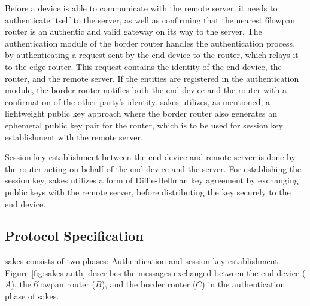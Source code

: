 Before a device is able to communicate with the remote server, it needs to authenticate itself to the server, as well as confirming that the nearest \gls{6lowpan} router is an authentic and valid gateway on its way to the server. The authentication module of the border router handles the authentication process, by authenticating a request sent by the end device to the router, which relays it to the edge router. This request contains the identity of the end device, the router, and the remote server. If the entities are registered in the authentication module, the border router notifies both the end device and the router with a confirmation of the other party's identity. \gls{sakes} utilizes, as mentioned, a lightweight public key approach where the border router also generates an ephemeral public key pair for the router, which is to be used for session key establishment with the remote server.

Session key establishment between the end device and remote server is done by the router acting on behalf of the end device and the server. For establishing the session key, \gls{sakes} utilizes a form of Diffie-Hellman key agreement by exchanging public keys with the remote server, before distributing the key securely to the end device.




\subsection{Protocol Specification}
\label{subsec:sakes-spec}

\gls{sakes} consists of two phases: Authentication and session key establishment. Figure \ref{fig:sakes-auth} describes the messages exchanged between the end device ($A$), the \gls{6lowpan} router ($B$), and the border router ($C$) in the authentication phase of \gls{sakes}.

